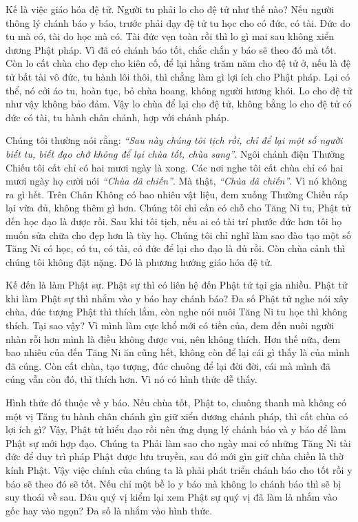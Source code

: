 \documentclass[
  12pt,
  oneside]{book}
\begin{document}
Kế là việc giáo hóa đệ tử. Người tu phải lo cho đệ tử như thế nào? Nếu người thông lý chánh báo y báo, trước phải dạy đệ tử tu học cho có đức, có tài. Đức do tu mà có, tài do học mà có. Tài đức vẹn toàn rồi thì lo gì mai sau không xiển dương Phật pháp. Vì đã có chánh báo tốt, chắc chắn y báo sẽ theo đó mà tốt. Còn lo cất chùa cho đẹp cho kiên cố, để lại hằng trăm năm cho đệ tử ở, nếu là đệ tử bất tài vô đức, tu hành lôi thôi, thì chẳng làm gì lợi ích cho Phật pháp. Lại có thể, nó cởi áo tu, hoàn tục, bỏ chùa hoang, không người hương khói. Lo cho đệ tử như vậy không bảo đảm. Vậy lo chùa để lại cho đệ tử, không bằng lo cho đệ tử có đức có tài, tu hành chân chánh, hợp với chánh pháp.

Chúng tôi thường nói rằng: \emph{``Sau này chúng tôi tịch rồi, chỉ để lại một số người biết tu, biết đạo chớ không để lại chùa tốt, chùa sang''}. Ngôi chánh điện Thường Chiếu tôi cất chỉ có hai mươi ngày là xong. Các nơi nghe tôi cất chùa chỉ có hai mươi ngày họ cười nói \emph{``Chùa dã chiến''}. Mà thật, \emph{``Chùa dã chiến''}. Vì nó không ra gì hết. Trên Chân Không có bao nhiêu vật liệu, đem xuống Thường Chiếu ráp lại vừa đủ, không thêm gì hơn. Chúng tôi chỉ cần có chỗ cho Tăng Ni tu, Phật tử đến học đạo là được rồi. Sau khi tôi tịch, nếu ai có tài trí phước đức hơn tôi họ muốn sửa chữa cho đẹp hơn là tùy họ. Chúng tôi chỉ nghĩ làm sao đào tạo một số Tăng Ni có học, có tu, có tài, có đức để lại cho đạo là đủ rồi. Còn chùa cảnh thì chúng tôi không đặt nặng. Đó là phương hướng giáo hóa đệ tử.

Kế đến là làm Phật sự. Phật sự thì có liên hệ đến Phật tử tại gia nhiều. Phật tử khi làm Phật sự thì nhắm vào y báo hay chánh báo? Đa số Phật tử nghe nói xây chùa, đúc tượng Phật thì thích lắm, còn nghe nói nuôi Tăng Ni tu học thì không thích. Tại sao vậy? Vì mình làm cực khổ mới có tiền của, đem đến nuôi người nhàn rỗi hơn mình là điều không được vui, nên không thích. Hơn thế nữa, đem bao nhiêu của đến Tăng Ni ăn cũng hết, không còn để lại cái gì thấy là của mình đã cúng. Còn cất chùa, tạo tượng, đúc chuông để lại đời đời, cái mà mình đã cúng vẫn còn đó, thì thích hơn. Vì nó có hình thức dễ thấy.

Hình thức đó thuộc về y báo. Nếu chùa tốt, Phật to, chuông thanh mà không có một vị Tăng tu hành chân chánh gìn giữ xiển dương chánh pháp, thì cất chùa có lợi ích gì? Vậy, Phật tử hiểu đạo rồi nên ứng dụng lý chánh báo và y báo để làm Phật sự mới hợp đạo. Chúng ta Phải làm sao cho ngày mai có những Tăng Ni tài đức để duy trì pháp Phật được lưu truyền, sau đó mới gìn giữ chùa chiền là thờ kính Phật. Vậy việc chính của chúng ta là phải phát triển chánh báo cho tốt rồi y báo sẽ theo đó sẽ tốt. Nếu chỉ một bề lo y báo mà không lo chánh báo thì sẽ bị suy thoái về sau. Đâu quý vị kiểm lại xem Phật sự quý vị đã làm là nhắm vào gốc hay vào ngọn? Đa số là nhắm vào hình thức.
\end{document}
